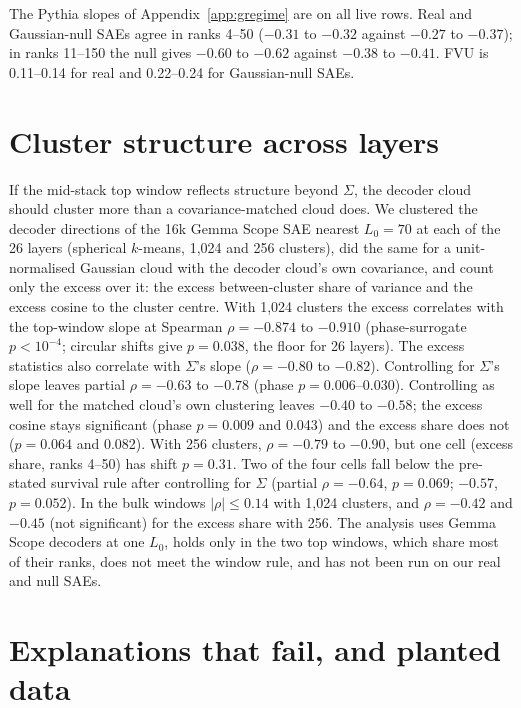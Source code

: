 \documentclass{article}
\newcommand{\Sig}{\Sigma}
\newcommand{\Lz}{L_0}
\begin{document}
The Pythia slopes of Appendix~\ref{app:gregime} are on all live rows. Real and Gaussian-null SAEs agree in ranks 4--50 ($-0.31$ to $-0.32$ against $-0.27$ to $-0.37$); in ranks 11--150 the null gives $-0.60$ to $-0.62$ against $-0.38$ to $-0.41$. FVU is 0.11--0.14 for real and 0.22--0.24 for Gaussian-null SAEs.

\section{Cluster structure across layers}
\label{app:cluster}

If the mid-stack top window reflects structure beyond $\Sig$, the decoder cloud should cluster more than a covariance-matched cloud does. We clustered the decoder directions of the 16k Gemma Scope SAE nearest $\Lz=70$ at each of the 26 layers (spherical $k$-means, 1,024 and 256 clusters), did the same for a unit-normalised Gaussian cloud with the decoder cloud's own covariance, and count only the excess over it: the excess between-cluster share of variance and the excess cosine to the cluster centre. With 1,024 clusters the excess correlates with the top-window slope at Spearman $\rho=-0.874$ to $-0.910$ (phase-surrogate $p<10^{-4}$; circular shifts give $p=0.038$, the floor for 26 layers). The excess statistics also correlate with $\Sig$'s slope ($\rho=-0.80$ to $-0.82$). Controlling for $\Sig$'s slope leaves partial $\rho=-0.63$ to $-0.78$ (phase $p=0.006$--0.030). Controlling as well for the matched cloud's own clustering leaves $-0.40$ to $-0.58$; the excess cosine stays significant (phase $p=0.009$ and 0.043) and the excess share does not ($p=0.064$ and 0.082). With 256 clusters, $\rho=-0.79$ to $-0.90$, but one cell (excess share, ranks 4--50) has shift $p=0.31$. Two of the four cells fall below the pre-stated survival rule after controlling for $\Sig$ (partial $\rho=-0.64$, $p=0.069$; $-0.57$, $p=0.052$). In the bulk windows $|\rho| \le 0.14$ with 1,024 clusters, and $\rho=-0.42$ and $-0.45$ (not significant) for the excess share with 256. The analysis uses Gemma Scope decoders at one $\Lz$, holds only in the two top windows, which share most of their ranks, does not meet the window rule, and has not been run on our real and null SAEs.

\clearpage

\section{Explanations that fail, and planted data}
\label{app:fail}
\end{document}
